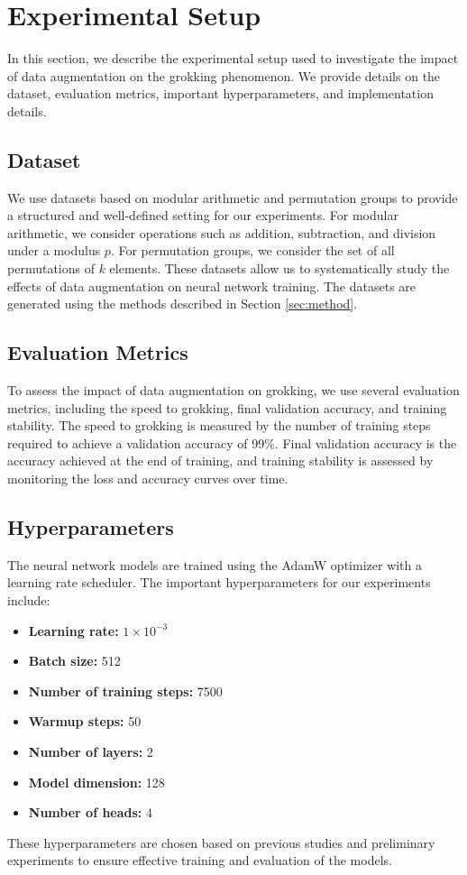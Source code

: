 \documentclass{article} %
\begin{document}
\section{Experimental Setup}
\label{sec:experimental}

In this section, we describe the experimental setup used to investigate the impact of data augmentation on the grokking phenomenon. We provide details on the dataset, evaluation metrics, important hyperparameters, and implementation details.

\subsection{Dataset}
We use datasets based on modular arithmetic and permutation groups to provide a structured and well-defined setting for our experiments. For modular arithmetic, we consider operations such as addition, subtraction, and division under a modulus \( p \). For permutation groups, we consider the set of all permutations of \( k \) elements. These datasets allow us to systematically study the effects of data augmentation on neural network training. The datasets are generated using the methods described in Section \ref{sec:method}.

\subsection{Evaluation Metrics}
To assess the impact of data augmentation on grokking, we use several evaluation metrics, including the speed to grokking, final validation accuracy, and training stability. The speed to grokking is measured by the number of training steps required to achieve a validation accuracy of 99\%. Final validation accuracy is the accuracy achieved at the end of training, and training stability is assessed by monitoring the loss and accuracy curves over time.

\subsection{Hyperparameters}
The neural network models are trained using the AdamW optimizer \citep{loshchilov2017adamw} with a learning rate scheduler. The important hyperparameters for our experiments include:
\begin{itemize}
    \item \textbf{Learning rate:} \(1 \times 10^{-3}\)
    \item \textbf{Batch size:} 512
    \item \textbf{Number of training steps:} 7500
    \item \textbf{Warmup steps:} 50
    \item \textbf{Number of layers:} 2
    \item \textbf{Model dimension:} 128
    \item \textbf{Number of heads:} 4
\end{itemize}
These hyperparameters are chosen based on previous studies and preliminary experiments to ensure effective training and evaluation of the models.
\end{document}
